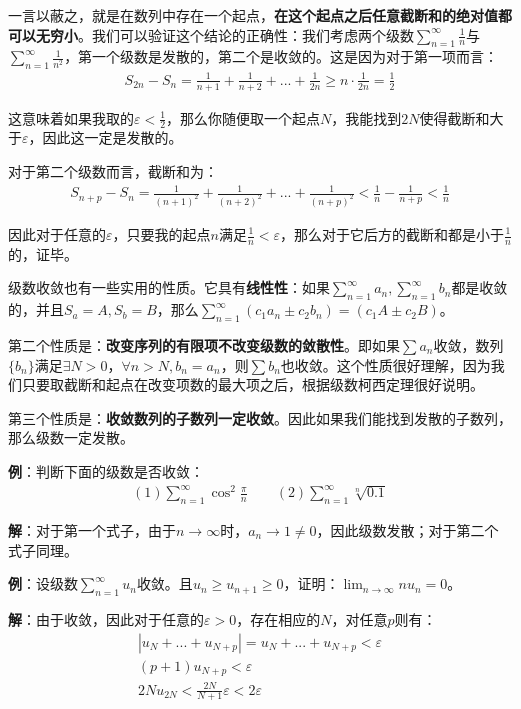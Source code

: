 \documentclass{ctexart}
\let\oldtextbf\textbf
\renewcommand{\textbf}[1]{\textcolor{brown!50!red}{\oldtextbf{#1}}}
\begin{document}
一言以蔽之，就是在数列中存在一个起点，\textbf{\color{brown!50!red}在这个起点之后任意截断和的绝对值都可以无穷小}。我们可以验证这个结论的正确性：我们考虑两个级数$\sum_{n=1}^\infty \frac{1}{n}$与$\sum_{n=1}^\infty \frac{1}{n^2}$，第一个级数是发散的，第二个是收敛的。这是因为对于第一项而言：
\begin{align*}
S_{2n}-S_n=\frac{1}{n+1}+\frac{1}{n+2}+...+\frac{1}{2n}\geq n\cdot\frac{1}{2n}=\frac{1}{2}     
\end{align*}

这意味着如果我取的$\varepsilon<\frac{1}{2}$，那么你随便取一个起点$N$，我能找到$2N$使得截断和大于$\varepsilon$，因此这一定是发散的。

对于第二个级数而言，截断和为：
\begin{align*}
S_{n+p}-S_n=\frac{1}{(n+1)^2}+\frac{1}{(n+2)^2}+...+\frac{1}{(n+p)^2}<\frac{1}{n}
 -\frac{1}{n+p}<\frac{1}{n}     
\end{align*}

因此对于任意的$\varepsilon$，只要我的起点$n$满足$\frac{1}{n}<\varepsilon$，那么对于它后方的截断和都是小于$\frac{1}{n}$的，证毕。

级数收敛也有一些实用的性质。它具有\textbf{\color{brown!50!red}线性性}：如果$\sum_{n=1}^\infty a_n,\sum_{n=1}^\infty b_n$都是收敛的，并且$S_a=A,S_b=B$，那么$\sum_{n=1}^\infty (c_1a_n\pm c_2b_n)=(c_1A\pm c_2B)$。

第二个性质是：\textbf{\color{brown!50!red}改变序列的有限项不改变级数的敛散性}。即如果$\sum a_n$收敛，数列$\{b_n\}$满足$\exists N>0，\forall n>N,b_n=a_n$，则$\sum b_n$也收敛。这个性质很好理解，因为我们只要取截断和起点在改变项数的最大项之后，根据级数柯西定理很好说明。

第三个性质是：\textbf{\color{brown!50!red}收敛数列的子数列一定收敛}。因此如果我们能找到发散的子数列，那么级数一定发散。

\textbf{\color{brown!50!red}例}：判断下面的级数是否收敛：
\begin{align*}
    (1)\sum_{n=1}^\infty \cos^2\frac{\pi}{n}\qquad (2)\sum_{n=1}^\infty \sqrt[n]{0.1}
\end{align*}

\textbf{\color{brown!50!red}解}：对于第一个式子，由于$n\to\infty$时，$a_n\to 1\neq 0$，因此级数发散；对于第二个式子同理。

\textbf{\color{brown!50!red}例}：设级数$\sum_{n=1}^\infty u_n$收敛。且$u_n\geq u_{n+1}\geq 0$，证明：$\lim_{n\to\infty} nu_n=0$。

\textbf{\color{brown!50!red}解}：由于收敛，因此对于任意的$\varepsilon>0$，存在相应的$N$，对任意$p$则有：
\begin{align*}
     |u_N+...+u_{N+p}|=u_N+...+u_{N+p}<\varepsilon \\
(p+1)u_{N+p}<\varepsilon \\
2Nu_{2N}<\frac{2N}{N+1}\varepsilon<2\varepsilon  
\end{align*}
\end{document}
